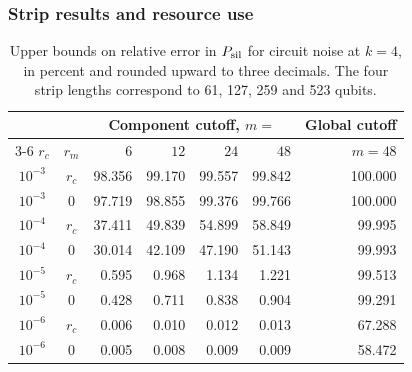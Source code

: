 \documentclass[10pt,twocolumn]{article}
\theoremstyle{definition}
\begin{document}
\subsubsection{Strip results and resource use}\label{app:strip-grid}
\begin{table}[H]
\centering\small
\setlength{\tabcolsep}{3pt}
\caption{Upper bounds on relative error in $P_{\rm sil}$ for circuit
noise at $k=4$, in percent and rounded upward to three decimals.
The four strip lengths correspond to 61, 127, 259 and 523 qubits.}
\label{tab:strip-circuit}
\smallskip
\begin{tabular}{@{}ccrrrrr@{}}
\toprule
 & & \multicolumn{4}{c}{Component cutoff, $m=$} & Global cutoff\\
\cmidrule(lr){3-6}
$r_c$ & $r_m$ & $6$ & $12$ & $24$ & $48$ & $m=48$\\
\midrule
$10^{-3}$ & $r_c$ & 98.356 & 99.170 & 99.557 & 99.842 & 100.000\\
$10^{-3}$ & $0$ & 97.719 & 98.855 & 99.376 & 99.766 & 100.000\\
$10^{-4}$ & $r_c$ & 37.411 & 49.839 & 54.899 & 58.849 & 99.995\\
$10^{-4}$ & $0$ & 30.014 & 42.109 & 47.190 & 51.143 & 99.993\\
$10^{-5}$ & $r_c$ & 0.595 & 0.968 & 1.134 & 1.221 & 99.513\\
$10^{-5}$ & $0$ & 0.428 & 0.711 & 0.838 & 0.904 & 99.291\\
$10^{-6}$ & $r_c$ & 0.006 & 0.010 & 0.012 & 0.013 & 67.288\\
$10^{-6}$ & $0$ & 0.005 & 0.008 & 0.009 & 0.009 & 58.472\\
\bottomrule
\end{tabular}
\end{table}
\end{document}
